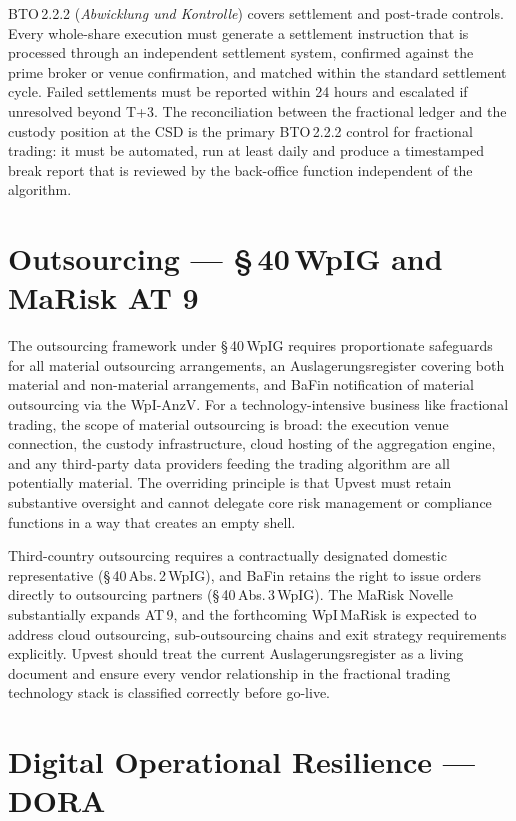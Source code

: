 \documentclass[12pt,a4paper]{report}
\begin{document}
BTO\,2.2.2 (\textit{Abwicklung und Kontrolle}) covers settlement and post-trade
controls. Every whole-share execution must generate a settlement instruction
that is processed through an independent settlement system, confirmed against
the prime broker or venue confirmation, and matched within the standard
settlement cycle. Failed settlements must be reported within 24 hours and
escalated if unresolved beyond T+3. The reconciliation between the fractional
ledger and the custody position at the CSD is the primary BTO\,2.2.2 control
for fractional trading: it must be automated, run at least daily and produce a
timestamped break report that is reviewed by the back-office function
independent of the algorithm.

\section{Outsourcing --- \S\,40\,WpIG and MaRisk AT 9}
\label{sec:outsourcing}

The outsourcing framework under \S\,40\,WpIG requires proportionate safeguards
for all material outsourcing arrangements, an Auslagerungsregister covering both
material and non-material arrangements, and BaFin notification of material
outsourcing via the WpI-AnzV. For a technology-intensive business like fractional
trading, the scope of material outsourcing is broad: the execution venue
connection, the custody infrastructure, cloud hosting of the aggregation engine,
and any third-party data providers feeding the trading algorithm are all
potentially material. The overriding principle is that Upvest must retain
substantive oversight and cannot delegate core risk management or compliance
functions in a way that creates an empty shell.

Third-country outsourcing requires a contractually designated domestic
representative (\S\,40\,Abs.\,2\,WpIG), and BaFin retains the right to issue
orders directly to outsourcing partners (\S\,40\,Abs.\,3\,WpIG). The MaRisk
Novelle substantially expands AT\,9, and the forthcoming WpI\,MaRisk is
expected to address cloud outsourcing, sub-outsourcing chains and exit strategy
requirements explicitly. Upvest should treat the current Auslagerungsregister
as a living document and ensure every vendor relationship in the fractional
trading technology stack is classified correctly before go-live.

\section{Digital Operational Resilience --- DORA}
\label{sec:dora}
\end{document}
